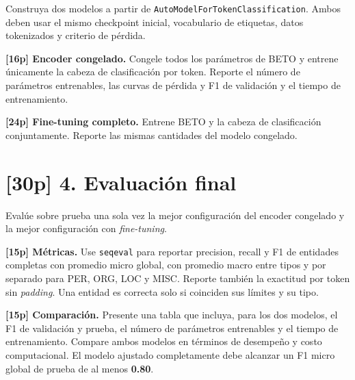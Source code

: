 \documentclass[11pt,a4paper]{article}
\begin{document}
Construya dos modelos a partir de \texttt{AutoModelForTokenClassification}. Ambos deben usar el mismo checkpoint inicial, vocabulario de etiquetas, datos tokenizados y criterio de pérdida.

\textbf{[16p] Encoder congelado.} Congele todos los parámetros de BETO y entrene únicamente la cabeza de clasificación por token. Reporte el número de parámetros entrenables, las curvas de pérdida y F1 de validación y el tiempo de entrenamiento.

\textbf{[24p] Fine-tuning completo.} Entrene BETO y la cabeza de clasificación conjuntamente. Reporte las mismas cantidades del modelo congelado.

\section*{[30p] 4. Evaluación final}

Evalúe sobre prueba una sola vez la mejor configuración del encoder congelado y la mejor configuración con \textit{fine-tuning}.

\textbf{[15p] Métricas.} Use \texttt{seqeval} para reportar precision, recall y F1 de entidades completas con promedio micro global, con promedio macro entre tipos y por separado para PER, ORG, LOC y MISC. Reporte también la exactitud por token sin \textit{padding}. Una entidad es correcta solo si coinciden sus límites y su tipo.

\textbf{[15p] Comparación.} Presente una tabla que incluya, para los dos modelos, el F1 de validación y prueba, el número de parámetros entrenables y el tiempo de entrenamiento. Compare ambos modelos en términos de desempeño y costo computacional. El modelo ajustado completamente debe alcanzar un F1 micro global de prueba de al menos \textbf{0.80}.
\end{document}
